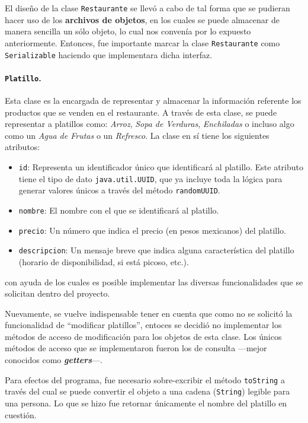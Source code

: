 El diseño de la clase \texttt{Restaurante} se llevó a cabo de tal forma que 
se pudieran hacer uso de los \textbf{archivos de objetos}, en los cuales se 
puede almacenar de manera sencilla un sólo objeto, lo cual nos convenía por 
lo expuesto anteriormente. Entonces, fue importante marcar la clase 
\texttt{Restaurante} como \texttt{Serializable} haciendo que implementara 
dicha interfaz.

\paragraph{\texttt{Platillo}. } Esta clase es la encargada de representar y 
almacenar la información referente los productos que se venden en el 
restaurante. A través de esta clase, se puede representar a platillos como:
\textit{Arroz}, \textit{Sopa de Verduras}, \textit{Enchiladas} o incluso algo 
como un \textit{Agua de Frutas} o un \textit{Refresco}. La clase en sí tiene 
los siguientes atributos:

\begin{itemize}
  \item \texttt{id}: Representa un identificador único que identificará al 
    platillo. Este atributo tiene el tipo de dato \texttt{java.util.UUID}, que 
    ya incluye toda la lógica para generar valores únicos a través del método 
    \texttt{randomUUID}.
  \item \texttt{nombre}: El nombre con el que se identificará al platillo.
  \item \texttt{precio}: Un número que indica el precio (en pesos mexicanos) 
    del platillo.
  \item \texttt{descripcion}: Un mensaje breve que indica alguna característica 
    del platillo (horario de disponibilidad, si está picoso, etc.).
\end{itemize}

con ayuda de los cuales es posible implementar las diversas funcionalidades que 
se solicitan dentro del proyecto.

Nuevamente, se vuelve indispensable tener en cuenta que como no se solicitó la 
funcionalidad de ``modificar platillos'', entoces se decidió no implementar los 
métodos de acceso de modificación para los objetos de esta clase. Los únicos 
métodos de acceso que se implementaron fueron los de consulta ---mejor conocidos
como \textit{\textbf{getters}}---.

Para efectos del programa, fue necesario sobre-excribir el método \texttt{toString} 
a través del cual se puede convertir el objeto a una cadena (\texttt{String}) 
legible para una persona. Lo que se hizo fue retornar únicamente el nombre del 
platillo en cuestión.

